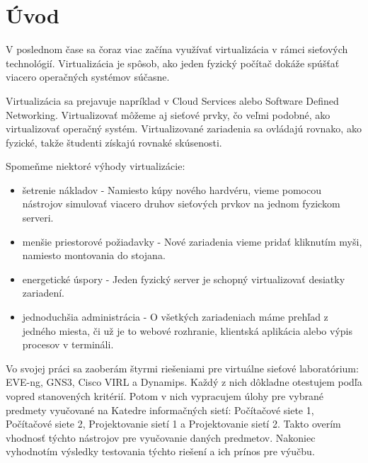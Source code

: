 \chapter*{Úvod}

V poslednom čase sa čoraz viac začína využívať virtualizácia v rámci sieťových technológií. Virtualizácia je spôsob, ako jeden fyzický počítač dokáže spúšťať viacero operačných systémov súčasne.

Virtualizácia sa prejavuje napríklad v Cloud Services alebo Software Defined Networking. Virtualizovať môžeme aj sieťové prvky, čo veľmi podobné, ako virtualizovať operačný systém. Virtualizované zariadenia sa ovládajú rovnako, ako fyzické, takže študenti získajú rovnaké skúsenosti.

Spomeňme niektoré výhody virtualizácie:
\begin{itemize}
\item šetrenie nákladov - Namiesto kúpy nového hardvéru, vieme pomocou nástrojov simulovať viacero druhov sieťových prvkov na jednom fyzickom serveri.
\item menšie priestorové požiadavky - Nové zariadenia vieme pridať kliknutím myši, namiesto montovania do stojana.
\item energetické úspory - Jeden fyzický server je schopný virtualizovať desiatky zariadení.
\item jednoduchšia administrácia - O všetkých zariadeniach máme prehľad z jedného miesta, či už je to webové rozhranie, klientská aplikácia alebo výpis procesov v termináli.
\end{itemize}

Vo svojej práci sa zaoberám štyrmi riešeniami pre virtuálne sieťové laboratórium: EVE-ng, GNS3, Cisco VIRL a Dynamips. Každý z nich dôkladne otestujem podľa vopred stanovených kritérií. Potom v nich vypracujem úlohy pre vybrané predmety vyučované na Katedre informačných sietí: Počítačové siete 1, Počítačové siete 2, Projektovanie sietí 1 a Projektovanie sietí 2. Takto overím vhodnosť týchto nástrojov pre vyučovanie daných predmetov. Nakoniec vyhodnotím výsledky testovania týchto riešení a ich prínos pre výučbu.